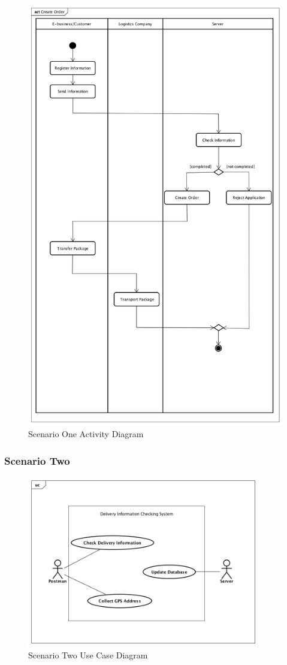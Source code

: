 \documentclass[12pt]{scrreprt}
\begin{document}
\begin{figure}[H]
  \centering\includegraphics[width=5in]{DocumentRes/1ActivityDiagram.png}
  \caption{Scenario One Activity Diagram}
\end{figure}

\subsubsection{Scenario Two}
\begin{figure}[H]
  \centering\includegraphics[width=4in]{DocumentRes/2UseCaseDiagram.png}
  \caption{Scenario Two Use Case Diagram}
\end{figure}
\end{document}
